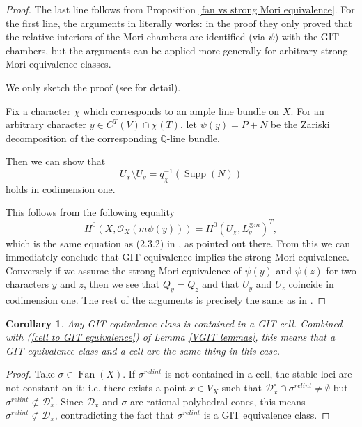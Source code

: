 \documentclass[12pt,twoside]{amsart}
\newtheorem{cor}[theo]{Corollary}
\theoremstyle{definition}
\newcommand\Supp{\mathop{\mathrm{Supp}}\nolimits}
\newcommand\Fan{\mathop{\mathrm{Fan}}}
\newcommand\bq{\mathbb{Q}}
\newcommand\OO{\mathcal{O}}
\begin{document}
\begin{proof}
The last line follows from Proposition \ref{fan vs strong Mori equivalence}.
For the first line, the arguments in \cite[Proof of Theorem 2.3]{hk} literally works:
in the proof they only proved that the relative interiors of the Mori chambers are
identified (via $\psi$) with the GIT chambers, but the arguments can be applied
more generally for arbitrary strong Mori equivalence classes. 

We only sketch the proof (see \cite[Proof of Theorem 2.3]{hk} for detail).

Fix a character $\chi$ which corresponds to an ample line bundle on $X$.
For an arbitrary character $y\in C^{T}(V)\cap\chi{(T)}$, let
$\psi{(y)}=P+N$ be the Zariski decomposition of the corresponding $\bq$-line bundle.

Then we can show that
\begin{equation*}
U_{\chi}\setminus U_{y}=q_{\chi}^{-1}(\Supp{(N)})
\end{equation*}
holds in codimension one.

This follows from the following equality
\begin{equation*}
H^0(X,\OO_X(m\psi{(y)}))=H^0(U_{\chi},L_{y}^{\otimes m})^{T},
\end{equation*}
which is the same equation as (2.3.2) in \cite[Proof of Theorem 2.3]{hk}, as pointed out
there. From this
we can immediately conclude that GIT equivalence implies the strong Mori equivalence.
Conversely if we assume the strong Mori equivalence of $\psi{(y)}$ and $\psi{(z)}$ for two characters $y$ and $z$,
then we see that $Q_y=Q_z$ and that $U_y$ and $U_z$ coincide in codimension one. The rest of the arguments
is precisely the same as in \cite[Proof of Theorem 2.3]{hk}.
\end{proof}

\begin{cor}\label{cell=GIT equivalence}
Any GIT equivalence class is contained in a GIT cell. Combined with
(\ref{cell to GIT equivalence}) of Lemma \ref{VGIT lemmas}, this means that a GIT equivalence class and
 a cell are the same thing in this case.
 \end{cor}
 \begin{proof}
 Take $\sigma\in\Fan{(X)}$. If $\sigma^{relint}$ is not contained in a cell, the stable loci are not constant
 on it: i.e. there exists a point $x\in V_X$ such that
 $\mathcal{D}_x^{\circ}\cap\sigma^{relint}\not=\emptyset$ but $\sigma^{relint}\not\subset\mathcal{D}_x^{\circ}$.
 Since $\mathcal{D}_x$ and $\sigma$ are rational polyhedral cones, this means
 $\sigma^{relint}\not\subset\mathcal{D}_x$, contradicting the fact that $\sigma^{relint}$ is a GIT equivalence class.
 \end{proof}
 
\end{document}
